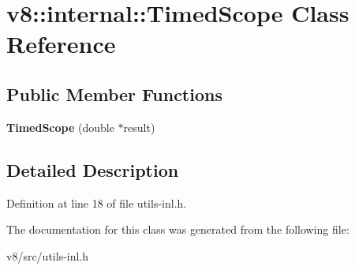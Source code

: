 \hypertarget{classv8_1_1internal_1_1TimedScope}{}\section{v8\+:\+:internal\+:\+:Timed\+Scope Class Reference}
\label{classv8_1_1internal_1_1TimedScope}
\subsection*{Public Member Functions}
\begin{DoxyCompactItemize}
\item 
\mbox{\label{classv8_1_1internal_1_1TimedScope_a2eed8e19aaf1110e060242628533ece3}} 
{\bfseries Timed\+Scope} (double $\ast$result)
\end{DoxyCompactItemize}


\subsection{Detailed Description}


Definition at line 18 of file utils-\/inl.\+h.



The documentation for this class was generated from the following file\+:\begin{DoxyCompactItemize}
\item 
v8/src/utils-\/inl.\+h\end{DoxyCompactItemize}
